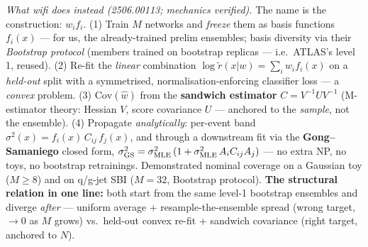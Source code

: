 \documentclass[11pt]{article}
\begin{document}
\smallskip\noindent\emph{What wifi does instead (2506.00113; mechanics verified).} The name is the construction:
$w_if_i$. (1) Train $M$ networks and \emph{freeze} them as basis functions $f_i(x)$ --- for us, the
already-trained prelim ensembles; basis diversity via their \emph{Bootstrap protocol} (members trained on
bootstrap replicas --- i.e.\ ATLAS's level 1, reused). (2) Re-fit the \emph{linear} combination
$\log\tilde r(x|w)=\sum_i w_i f_i(x)$ on a \emph{held-out} split with a symmetrised, normalisation-enforcing
classifier loss --- a \emph{convex} problem. (3) $\mathrm{Cov}(\hat w)$ from the \textbf{sandwich estimator}
$C=V^{-1}UV^{-1}$ (M-estimator theory: Hessian $V$, score covariance $U$ --- anchored to the \emph{sample}, not
the ensemble). (4) Propagate \emph{analytically}: per-event band $\sigma^2(x)=f_i(x)\,C_{ij}\,f_j(x)$, and
through a downstream fit via the \textbf{Gong--Samaniego} closed form,
$\sigma^2_{\rm GS}=\sigma^2_{\rm MLE}\,(1+\sigma^2_{\rm MLE}\,A_iC_{ij}A_j)$ --- no extra NP, no toys, no
bootstrap retrainings. Demonstrated nominal coverage on a Gaussian toy ($M\ge8$) and on q/g-jet SBI ($M=32$,
Bootstrap protocol). \textbf{The structural relation in one line:} both start from the same level-1 bootstrap
ensembles and diverge \emph{after} --- uniform average $+$ resample-the-ensemble spread (wrong target, $\to0$ as
$M$ grows) vs.\ held-out convex re-fit $+$ sandwich covariance (right target, anchored to $N$).
\end{document}
